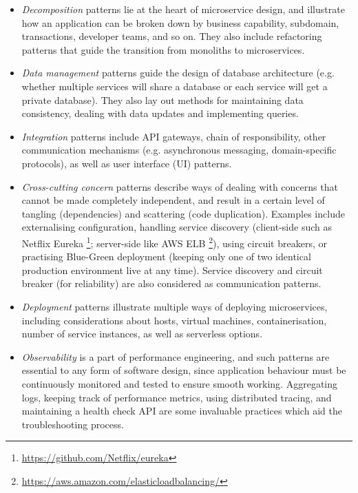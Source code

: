 \begin{itemize}
  \item \textit{Decomposition} patterns lie at the heart of microservice design, and illustrate how an application can be broken down by business capability, subdomain, transactions, developer teams, and so on. They also include refactoring patterns that guide the transition from monoliths to microservices.

  \item \textit{Data management} patterns guide the design of database architecture (e.g. whether multiple services will share a database or each service will get a private database). They also lay out methods for maintaining data consistency, dealing with data updates and implementing queries.

  \item \textit{Integration} patterns include API gateways, chain of responsibility, other communication mechanisms (e.g. asynchronous messaging, domain-specific protocols), as well as user interface (UI) patterns.

  \item \textit{Cross-cutting concern} patterns describe ways of dealing with concerns that cannot be made completely independent, and result in a certain level of tangling (dependencies) and scattering (code duplication). Examples include externalising configuration, handling service discovery (client-side such as Netflix Eureka \footnote{\url{https://github.com/Netflix/eureka}}; server-side like AWS ELB \footnote{\url{https://aws.amazon.com/elasticloadbalancing/}}), using circuit breakers, or practising Blue-Green deployment (keeping only one of two identical production environment live at any time). Service discovery and circuit breaker (for reliability) are also considered as communication patterns.

  \item \textit{Deployment} patterns illustrate multiple ways of deploying microservices, including considerations about hosts, virtual machines, containerisation, number of service instances, as well as serverless options.

  \item \textit{Observability} is a part of performance engineering, and such patterns are essential to any form of software design, since application behaviour must be continuously monitored and tested to ensure smooth working. Aggregating logs, keeping track of performance metrics, using distributed tracing, and maintaining a health check API are some invaluable practices which aid the troubleshooting process.
\end{itemize}

